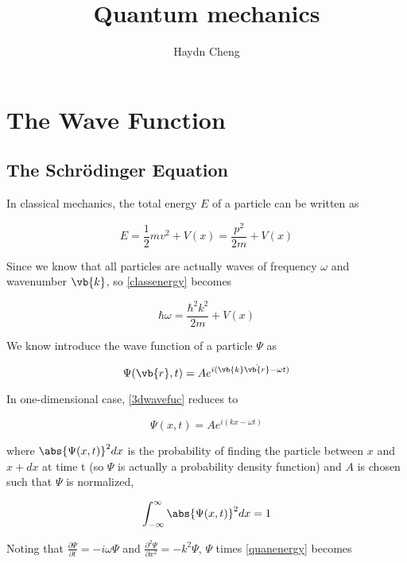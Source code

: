 \documentclass[a4paper,12pt]{report}
\title{Quantum mechanics}
\author{Haydn Cheng}
\date{}
\begin{document}
\maketitle
\tableofcontents
	
\chapter{The Wave Function}
	
\section{The Schrödinger Equation}
	
In classical mechanics, the total energy \(E\) of a particle can be written as 


\begin{equation}
  E=\frac{1}{2} mv^2 + V(x) = \frac{p^2}{2m} + V(x) \label{classenergy}
\end{equation}

Since we know that all particles are actually waves of frequency \(\omega\) and wavenumber \(\vb{k}\), so \cref{classenergy} becomes

\begin{equation} 
  \hbar \omega = \frac{\hbar^2k^2}{2m} + V(x) \label{quanenergy}
\end{equation}

We know introduce the wave function of a particle \(\Psi \) as

\begin{equation}
  \Psi (\vb{r} ,t) = Ae^{i(\vb{k} \dot{\vb{r} } - \omega t )} \label{3dwavefuc} 
\end{equation}

In one-dimensional case, \cref{3dwavefuc} reduces to

\begin{equation}
  \Psi (x,t) = Ae^{i(kx - \omega t)} \label{1dwavefuc}  
\end{equation}

where \(\abs{\Psi (x,t)}^2 dx\) is the probability of finding the particle between \(x\) and \(x + dx\) at time t (so \(\Psi\) is actually a probability density function) and \(A\) is chosen such that \(\Psi\) is normalized, \ie

\begin{equation}
  \int_{-\infty}^{\infty} \abs{\Psi (x,t)}^2 dx = 1
\end{equation}

Noting that \(\frac{\partial \Psi }{\partial t} = -i \omega\Psi \) and \(\frac{\partial^2\Psi }{\partial x^2 } = -k^2\Psi \), \(\Psi\) times \cref{quanenergy} becomes
\end{document}
